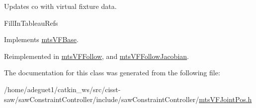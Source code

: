 Updates co with virtual fixture data. 

Fill\-In\-Tableau\-Refs 

Implements \hyperlink{classmts_v_f_base_aef5a28675f79945766a2b114c957ae6f}{mts\-V\-F\-Base}.



Reimplemented in \hyperlink{classmts_v_f_follow_a2fe8bc0fb58b00efe62b4d145e561989}{mts\-V\-F\-Follow}, and \hyperlink{classmts_v_f_follow_jacobian_a710e3cf5407eccac61f7f1d3a80d9bca}{mts\-V\-F\-Follow\-Jacobian}.



The documentation for this class was generated from the following file\-:\begin{DoxyCompactItemize}
\item 
/home/adeguet1/catkin\-\_\-ws/src/cisst-\/saw/saw\-Constraint\-Controller/include/saw\-Constraint\-Controller/\hyperlink{mts_v_f_joint_pos_8h}{mts\-V\-F\-Joint\-Pos.\-h}\end{DoxyCompactItemize}
